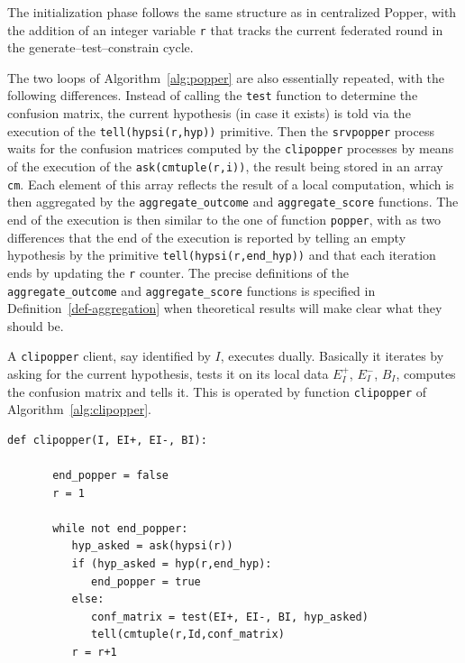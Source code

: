 The initialization phase follows the same structure as in centralized Popper, with the addition of an integer variable \texttt{r} that tracks the current federated round in the generate–test–constrain cycle.

The two loops of Algorithm~\ref{alg:popper} are also essentially repeated, with the following differences. Instead of calling the \texttt{test} function to determine the confusion matrix, the current hypothesis (in case it exists) is told via the execution of the \texttt{tell(hypsi(r,hyp))} primitive. Then the \texttt{srvpopper} process waits for the confusion matrices computed by the \texttt{clipopper} processes by means of the execution of the \texttt{ask(cmtuple(r,i))}, the result being stored in an array \texttt{cm}. Each element of this array reflects the result of a local computation, which is then aggregated by the \texttt{aggregate\_outcome} and \texttt{aggregate\_score} functions. The end of the execution is then similar to the one of function \texttt{popper}, with as two differences that the end of the execution is reported by telling an empty hypothesis by the primitive \texttt{tell(hypsi(r,end\_hyp))} and that each iteration ends by updating the \texttt{r} counter. The precise definitions of the \texttt{aggregate\_outcome} and \texttt{aggregate\_score} functions is specified in Definition~\ref{def-aggregation} when theoretical results will make clear what they should be.






\medskip
A \texttt{clipopper} client, say identified by $I$, executes dually. Basically it  
iterates by asking for the current hypothesis, tests it on its local
data $E_I^+$, $E_I^-$, $B_I$, computes the confusion matrix and tells it. This is operated by function \texttt{clipopper} of Algorithm~\ref{alg:clipopper}.

\begin{algorithm}[t]
  \caption{Clipopper client}
  \label{alg:clipopper}
  \small
  \begin{lstlisting}
def clipopper(I, EI+, EI-, BI):

       end_popper = false
       r = 1

       while not end_popper:
          hyp_asked = ask(hypsi(r))
          if (hyp_asked = hyp(r,end_hyp):
             end_popper = true
          else:
             conf_matrix = test(EI+, EI-, BI, hyp_asked)
             tell(cmtuple(r,Id,conf_matrix)
          r = r+1

  \end{lstlisting}
\end{algorithm}




